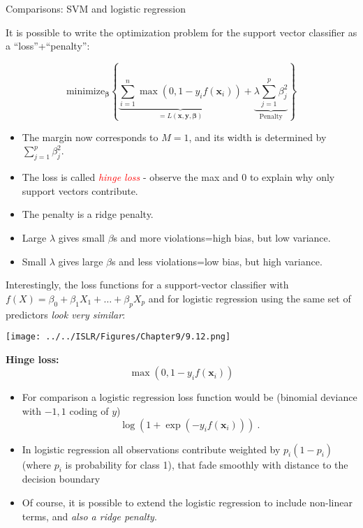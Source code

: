 \documentclass[10pt,ignorenonframetext,]{beamer}
\begin{document}
\begin{frame}{Comparisons: SVM and logistic regression}
\protect\hypertarget{comparisons-svm-and-logistic-regression}{}

It is possible to write the optimization problem for the support vector
classifier as a ``loss''+``penalty'':

\[\text{minimize}_{\boldsymbol \beta} \left\{ \underbrace{\sum_{i=1}^n \max(0,1-y_i f({\boldsymbol x}_i))}_{=L(\boldsymbol x, \boldsymbol{y},\boldsymbol\beta)}+ \underbrace{\lambda \sum_{j=1}^p \beta_j^2}_{\text{Penalty}} \right\}\]

\begin{itemize}
\item
  The margin now corresponds to \(M=1\), and its width is determined by
  \(\sum_{j=1}^p \beta_j^2\).
\item
  The loss is called \emph{\textcolor{red}{hinge loss}} - observe the
  max and 0 to explain why only support vectors contribute.
\item
  The penalty is a ridge penalty.
\item
  Large \(\lambda\) gives small \(\beta\)s and more violations=high
  bias, but low variance.
\item
  Small \(\lambda\) gives large \(\beta\)s and less violations=low bias,
  but high variance.
\end{itemize}

\end{frame}

\begin{frame}

Interestingly, the loss functions for a support-vector classifier with
\(f(X)=\beta_0 + \beta_1X_1 +\ldots + \beta_pX_p\) and for logistic
regression using the same set of predictors \emph{look very similar}:
\vspace{-2mm}

\centering

\texttt{[image: ../../ISLR/Figures/Chapter9/9.12.png]}

\end{frame}

\begin{frame}

\textbf{Hinge loss:} \[\max(0,1-y_if({\boldsymbol x}_i))\]

\begin{itemize}
\item
  For comparison a logistic regression loss function would be (binomial
  deviance with \(-1,1\) coding of \(y\))
  \[ \log(1+\exp(-y_i f({\boldsymbol x}_i)))\ .\]
\item
  In logistic regression all observations contribute weighted by
  \(p_i(1-p_i)\) (where \(p_i\) is probability for class 1), that fade
  smoothly with distance to the decision boundary
\item
  Of course, it is possible to extend the logistic regression to include
  non-linear terms, and \emph{also a ridge penalty}.
\end{itemize}

\end{frame}
\end{document}
